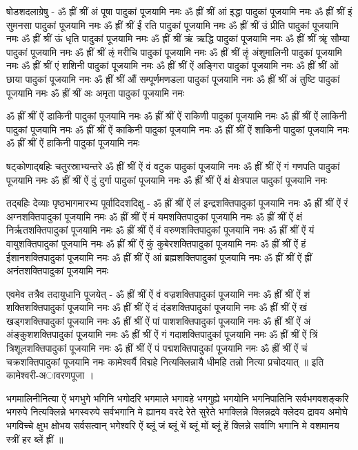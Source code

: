 षोडशदलाग्रेषु -
ॐ ह्रीं श्रीं अं पूषा पादुकां पूजयामि नमः
ॐ ह्रीं श्रीं आं इद्धा पादुकां पूजयामि नमः
ॐ ह्रीं श्रीं इं सुमनसा पादुकां पूजयामि नमः
ॐ ह्रीं श्रीं ईं रति पादुकां पूजयामि नमः
ॐ ह्रीं श्रीं उं प्रीति पादुकां पूजयामि नमः
ॐ ह्रीं श्रीं ऊं धृति पादुकां पूजयामि नमः
ॐ ह्रीं श्रीं ऋं ऋद्धि पादुकां पूजयामि नमः
ॐ ह्रीं श्रीं ॠं सौम्या पादुकां पूजयामि नमः
ॐ ह्रीं श्रीं ऌं मरीचि पादुकां पूजयामि नमः
ॐ ह्रीं श्रीं ऌृं अंशुमालिनी पादुकां पूजयामि नमः
ॐ ह्रीं श्रीं एं शशिनी पादुकां पूजयामि नमः
ॐ ह्रीं श्रीं ऐं अङ्गिरा पादुकां पूजयामि नमः
ॐ ह्रीं श्रीं ओं छाया पादुकां पूजयामि नमः
ॐ ह्रीं श्रीं औं सम्पूर्णमणडला पादुकां पूजयामि नमः
ॐ ह्रीं श्रीं अं तुष्टि पादुकां पूजयामि नमः
ॐ ह्रीं श्रीं अः अमृता पादुकां पूजयामि नमः

ॐ ह्रीं श्रीं ऐं डाकिनी पादुकां पूजयामि नमः
ॐ ह्रीं श्रीं ऐं राकिणी पादुकां पूजयामि नमः
ॐ ह्रीं श्रीं ऐं लाकिनी पादुकां पूजयामि नमः
ॐ ह्रीं श्रीं ऐं काकिनी पादुकां पूजयामि नमः
ॐ ह्रीं श्रीं ऐं शाकिनी पादुकां पूजयामि नमः
ॐ ह्रीं श्रीं ऐं हाकिनी पादुकां पूजयामि नमः

षट्कोणाद्बहिः चतुरस्राभ्यन्तरे 
ॐ ह्रीं श्रीं ऐं वं वटुक पादुकां पूजयामि नमः
ॐ ह्रीं श्रीं ऐं गं गणपति पादुकां पूजयामि नमः
ॐ ह्रीं श्रीं ऐं दुं दुर्गा पादुकां पूजयामि नमः
ॐ ह्रीं श्रीं ऐं क्षं क्षेत्रपाल पादुकां पूजयामि नमः

तद्बहिः देव्याः पृष्ठभागमारभ्य पूर्वादिदशदिक्षु -
ॐ ह्रीं श्रीं ऐं लं इन्द्रशक्तिपादुकां पूजयामि नमः
ॐ ह्रीं श्रीं ऐं रं अग्नशक्तिपादुकां पूजयामि नमः
ॐ ह्रीं श्रीं ऐं मं यमशक्तिपादुकां पूजयामि नमः
ॐ ह्रीं श्रीं ऐं क्षं निर्ऋतशक्तिपादुकां पूजयामि नमः
ॐ ह्रीं श्रीं ऐं वं वरुणशक्तिपादुकां पूजयामि नमः
ॐ ह्रीं श्रीं ऐं यं वायुशक्तिपादुकां पूजयामि नमः
ॐ ह्रीं श्रीं ऐं कुं कुबेरशक्तिपादुकां पूजयामि नमः
ॐ ह्रीं श्रीं ऐं हं ईशानशक्तिपादुकां पूजयामि नमः
ॐ ह्रीं श्रीं ऐं आं ब्रह्मशक्तिपादुकां पूजयामि नमः
ॐ ह्रीं श्रीं ऐं ह्रीं अनंतशक्तिपादुकां पूजयामि नमः

एवमेव तत्रैव तदायुधानि पूजयेत् -
ॐ ह्रीं श्रीं ऐं वं वज्रशक्तिपादुकां पूजयामि नमः
ॐ ह्रीं श्रीं ऐं शं शक्तिशक्तिपादुकां पूजयामि नमः
ॐ ह्रीं श्रीं ऐं दं दंडशक्तिपादुकां पूजयामि नमः
ॐ ह्रीं श्रीं ऐं खं खड्गशक्तिपादुकां पूजयामि नमः
ॐ ह्रीं श्रीं ऐं पां पाशशक्तिपादुकां पूजयामि नमः
ॐ ह्रीं श्रीं ऐं अं अंङ्कुशशक्तिपादुकां पूजयामि नमः
ॐ ह्रीं श्रीं ऐं गं गदाशक्तिपादुकां पूजयामि नमः
ॐ ह्रीं श्रीं ऐं त्रिं त्रिशूलशक्तिपादुकां पूजयामि नमः
ॐ ह्रीं श्रीं ऐं पं पद्मशक्तिपादुकां पूजयामि नमः
ॐ ह्रीं श्रीं ऐं चं चक्रशक्तिपादुकां पूजयामि नमः
कामेश्वर्यै विद्महे नित्यक्लिन्नायै धीमहि तन्नो नित्या प्रचोदयात् ॥
इति कामेश्वरी-अावरणपूजा ।

भगमालिनीनित्या 
ऐं भगभुगे भगिनि भगोदरि भगमाले भगावहे भगगुह्ये भगयोनि भगनिपातिनि सर्वभगवशङ्करि भगरुपे नित्यक्लिन्ने भगस्वरुपे सर्वभगानि मे ह्यानय वरदे रेते सुरेते भगक्लिन्ने क्लिन्नद्रवे क्लेदय द्रावय अमोघे भगविच्चे क्षुभ क्षोभय सर्वसत्वान् भगेश्वरि ऐं ब्लूं जं ब्लूं भें ब्लूं मों ब्लूं हें क्लिन्ने सर्वाणि भगानि मे वशमानय स्त्रीं हर ब्लें ह्रीं ॥

